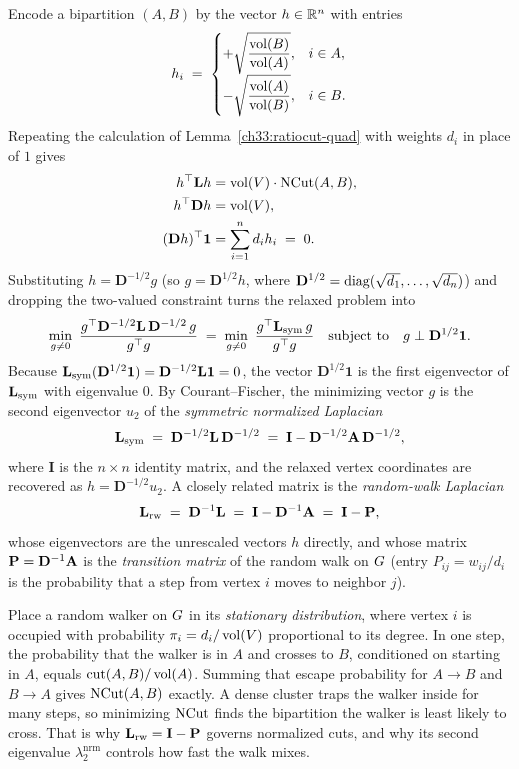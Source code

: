 Encode a bipartition $(A,B)$ by the vector $h \in \mathbb{R}^n$ with entries
\[
  h_i \;=\;
  \begin{cases}
    +\sqrt{\dfrac{\operatorname{vol}(B)}{\operatorname{vol}(A)}}, & i \in A,\\[8pt]
    -\sqrt{\dfrac{\operatorname{vol}(A)}{\operatorname{vol}(B)}}, & i \in B.
  \end{cases}
\]
Repeating the calculation of Lemma~\ref{ch33:ratiocut-quad} with weights $d_i$ in place of $1$ gives
\begin{align*}
  h^\top\mathbf{L} h &= \operatorname{vol}(V)\cdot\operatorname{NCut}(A,B),\\
  h^\top\mathbf{D} h &= \operatorname{vol}(V),\\
  (\mathbf{D} h)^\top \mathbf{1} &= \sum_{i=1}^n d_i h_i \;=\; 0.
\end{align*}
Substituting $h = \mathbf{D}^{-1/2}g$ (so $g = \mathbf{D}^{1/2}h$, where $\mathbf{D}^{1/2} = \operatorname{diag}(\sqrt{d_1},\dots,\sqrt{d_n})$) and dropping the two-valued constraint turns the relaxed problem into
\[
  \min_{g \ne 0}\ \frac{g^\top \mathbf{D}^{-1/2}\mathbf{L}\,\mathbf{D}^{-1/2}\, g}{g^\top g}
  \;=\; \min_{g \ne 0}\ \frac{g^\top \mathbf{L}_{\mathrm{sym}}\,g}{g^\top g}
  \quad\text{subject to}\quad g\perp \mathbf{D}^{1/2}\mathbf{1}.
\]
Because $\mathbf{L}_{\mathrm{sym}}(\mathbf{D}^{1/2}\mathbf{1}) = \mathbf{D}^{-1/2}\mathbf{L}\mathbf{1} = 0$, the vector $\mathbf{D}^{1/2}\mathbf{1}$ is the first eigenvector of $\mathbf{L}_{\mathrm{sym}}$ with eigenvalue $0$. By Courant--Fischer, the minimizing vector $g$ is the second eigenvector $u_2$ of the \emph{symmetric normalized Laplacian}
\[
  \mathbf{L}_{\mathrm{sym}} \;=\; \mathbf{D}^{-1/2}\mathbf{L}\,\mathbf{D}^{-1/2} \;=\; \mathbf{I} - \mathbf{D}^{-1/2}\mathbf{A}\,\mathbf{D}^{-1/2},
\]
where $\mathbf{I}$ is the $n\times n$ identity matrix, and the relaxed vertex coordinates are recovered as $h=\mathbf{D}^{-1/2}u_2$. A closely related matrix is the
\emph{random-walk Laplacian}
\[
  \mathbf{L}_{\mathrm{rw}} \;=\; \mathbf{D}^{-1}\mathbf{L} \;=\; \mathbf{I} - \mathbf{D}^{-1}\mathbf{A} \;=\; \mathbf{I} - \mathbf{P},
\]
whose eigenvectors are the unrescaled vectors $h$ directly, and whose matrix $\mathbf{P}=\mathbf{D}^{-1}\mathbf{A}$ is the \emph{transition matrix} of the random walk on $G$ (entry $P_{ij} = w_{ij}/d_i$ is the probability that a step from vertex $i$ moves to neighbor $j$).

\begin{intuitionbox}
Place a random walker on $G$ in its \emph{stationary distribution}, where vertex $i$ is occupied with probability $\pi_i = d_i / \operatorname{vol}(V)$ proportional to its degree. In one step, the probability that the walker is in $A$ and crosses to $B$, conditioned on starting in $A$, equals $\operatorname{cut}(A,B)/\operatorname{vol}(A)$. Summing that escape probability for $A \to B$ and $B \to A$ gives $\operatorname{NCut}(A,B)$ exactly. A dense cluster traps the walker inside for many steps, so minimizing $\operatorname{NCut}$ finds the bipartition the walker is least likely to cross. That is why $\mathbf{L}_{\mathrm{rw}} = \mathbf{I} - \mathbf{P}$ governs normalized cuts, and why its second eigenvalue $\lambda_2^{\mathrm{nrm}}$ controls how fast the walk mixes.
\end{intuitionbox}

